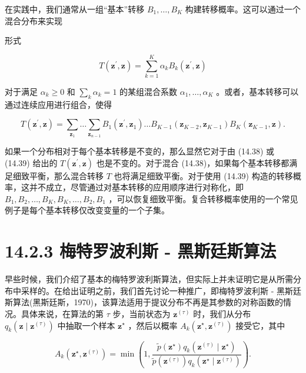 \documentclass[10pt]{report}
\begin{document}
在实践中，我们通常从一组“基本”转移 \({B}_{1},\ldots ,{B}_{K}\) 构建转移概率。这可以通过一个混合分布来实现

形式

\[
T\left( {{\mathbf{z}}^{\prime },\mathbf{z}}\right)  = \mathop{\sum }\limits_{{k = 1}}^{K}{\alpha }_{k}{B}_{k}\left( {{\mathbf{z}}^{\prime },\mathbf{z}}\right)  \tag{14.38}
\]

对于满足 \({\alpha }_{k} \geq  0\) 和 \(\mathop{\sum }\limits_{k}{\alpha }_{k} = 1\) 的某组混合系数 \({\alpha }_{1},\ldots ,{\alpha }_{K}\) 。或者，基本转移可以通过连续应用进行组合，使得

\[
T\left( {{\mathbf{z}}^{\prime },\mathbf{z}}\right)  = \mathop{\sum }\limits_{{\mathbf{z}}_{1}}\ldots \mathop{\sum }\limits_{{\mathbf{z}}_{n - 1}}{B}_{1}\left( {{\mathbf{z}}^{\prime },{\mathbf{z}}_{1}}\right) \ldots {B}_{K - 1}\left( {{\mathbf{z}}_{K - 2},{\mathbf{z}}_{K - 1}}\right) {B}_{K}\left( {{\mathbf{z}}_{K - 1},\mathbf{z}}\right) . \tag{14.39}
\]

如果一个分布相对于每个基本转移是不变的，那么显然它对于由 (14.38) 或 (14.39) 给出的 \(T\left( {{\mathbf{z}}^{\prime },\mathbf{z}}\right)\) 也是不变的。对于混合 (14.38)，如果每个基本转移都满足细致平衡，那么混合转移 \(T\) 也将满足细致平衡。对于使用 (14.39) 构造的转移概率，这并不成立，尽管通过对基本转移的应用顺序进行对称化，即 \({B}_{1},{B}_{2},\ldots ,{B}_{K},{B}_{K},\ldots ,{B}_{2},{B}_{1}\) ，可以恢复细致平衡。复合转移概率使用的一个常见例子是每个基本转移仅改变变量的一个子集。

\section*{14.2.3 梅特罗波利斯 - 黑斯廷斯算法}

早些时候，我们介绍了基本的梅特罗波利斯算法，但实际上并未证明它是从所需分布中采样的。在给出证明之前，我们首先讨论一种推广，即梅特罗波利斯 - 黑斯廷斯算法(黑斯廷斯，1970)，该算法适用于提议分布不再是其参数的对称函数的情况。具体来说，在算法的第 \(\tau\) 步，当前状态为 \({\mathbf{z}}^{\left( \tau \right) }\) 时，我们从分布 \({q}_{k}\left( {\mathbf{z} \mid  {\mathbf{z}}^{\left( \tau \right) }}\right)\) 中抽取一个样本 \({\mathbf{z}}^{ \star  }\) ，然后以概率 \({A}_{k}\left( {{\mathbf{z}}^{ \star  },{\mathbf{z}}^{\left( \tau \right) }}\right)\) 接受它，其中

\[
{A}_{k}\left( {{\mathbf{z}}^{ \star  },{\mathbf{z}}^{\left( \tau \right) }}\right)  = \min \left( {1,\frac{\widetilde{p}\left( {\mathbf{z}}^{ \star  }\right) {q}_{k}\left( {{\mathbf{z}}^{\left( \tau \right) } \mid  {\mathbf{z}}^{ \star  }}\right) }{\widetilde{p}\left( {\mathbf{z}}^{\left( \tau \right) }\right) {q}_{k}\left( {{\mathbf{z}}^{ \star  } \mid  {\mathbf{z}}^{\left( \tau \right) }}\right) }}\right) . \tag{14.40}
\]
\end{document}
